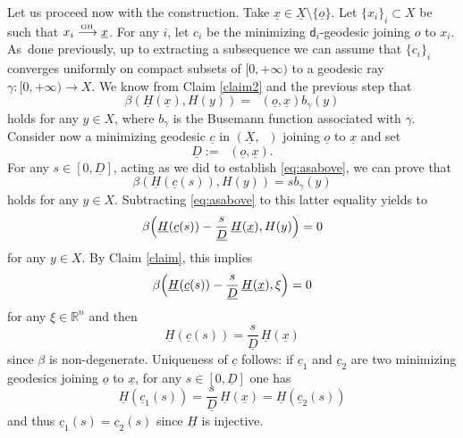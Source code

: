 \documentclass[10pt]{amsart}
\def\To#1{\mathchoice{\xrightarrow{\textstyle\kern4pt#1\kern3pt}}{\stackrel{#1}{\longrightarrow}}{}{}}
\newcommand{\sGH}{{\scriptscriptstyle\mathrm{GH}\,}}
\let\backslash\setminus
\theoremstyle{plain}
\theoremstyle{definition}
\newcommand{\setR}{\mathbb{R}}
\newcommand{\dist}{\mathsf{d}}
\newcommand{\uX}{\underline{X}}
\DeclareMathOperator{\udist}{\underline{\dist}}
\newcommand{\uo}{\underline{o}}
\newcommand{\ux}{\underline{x}}
\newcommand{\uc}{\underline{c}}
\newcommand{\uD}{\underline{D}}
\newcommand{\uH}{\underline{H}}
\begin{document}
Let us proceed now with the construction. Take $\ux \in \uX \backslash \{\uo\}$. Let $\{x_i\}_i \subset X$ be such that $x_i \To{\sGH} \ux$. For any $i$, let $c_i$ be the minimizing $\dist_i$-geodesic joining $o$ to $x_i$. As~done previously, up to extracting a subsequence we can assume that $\{c_i\}_i$ converges uniformly on compact subsets of $[0,+\infty)$ to a geodesic ray $\gamma: [0,+\infty) \to X$. We know from Claim \ref{claim2} and the previous step that
\begin{equation}\label{eq:asabove}
\beta(\underline{H}(\ux),H(y)) = \udist(\uo,\ux) b_\gamma(y)
\end{equation}
holds for any $y \in X$, where $b_\gamma$ is the Busemann function associated with $\gamma$. Consider now a minimizing geodesic $\uc$ in $(\uX,\udist)$ joining $\uo$ to $\ux$ and set
\[
\uD:=\udist(\uo,\ux).
\]
For any $s \in [0,\uD]$, acting as we did to establish \eqref{eq:asabove}, we can prove that
\[
\beta(\underline{H}(\uc(s)),H(y)) = s b_\gamma(y)
\]
holds for any $y \in X$. Subtracting \eqref{eq:asabove} to this latter equality yields to
\begin{equation}%
\beta\Bigl(\underline{H}(\uc(s)) - \frac{s}{\uD}\,\uH(\ux), H(y)\Bigr) = 0
\end{equation}
for any $y \in X$. By Claim \ref{claim}, this implies
\begin{equation}%
\beta\Bigl(\underline{H}(\uc(s)) - \frac{s}{\uD}\,\uH(\ux), \xi \Bigr) = 0
\end{equation}
for any $\xi \in \setR^n$ and then
\begin{equation}\label{eq:H}
\underline{H}(\uc(s)) = \frac{s}{\uD}\,\uH(\ux)
\end{equation}
since $\beta$ is non-degenerate. Uniqueness of $\uc$ follows: if $\uc_1$ and $\uc_2$ are two minimizing geodesics joining $\uo$ to $\ux$, for any $s \in [0,\uD]$ one has
\[
\uH(\uc_1(s)) = \frac{s}{\uD}\,\uH(\ux) =\uH(\uc_2(s))
\]
and thus $\uc_1(s)=\uc_2(s)$ since $\uH$ is injective.
\end{document}
